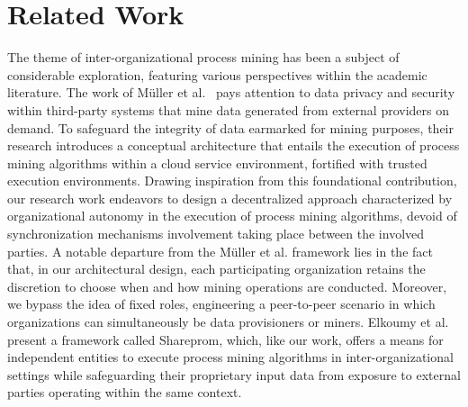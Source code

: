 \section{Related Work}
\label{sec:background}
The theme of inter-organizational process mining has been a subject of considerable exploration, featuring various perspectives within the academic literature. The work of M{\"u}ller et al.~\cite{muller2021process} pays attention to data privacy and security within third-party systems that mine data generated from external providers on demand. To safeguard the integrity of data earmarked for mining purposes, their research introduces a conceptual architecture that entails the execution of process mining algorithms within a cloud service environment, fortified with trusted execution environments. %
Drawing inspiration from this foundational contribution, our research work endeavors to design a decentralized approach characterized by organizational autonomy in the execution of process mining algorithms, devoid of synchronization mechanisms involvement taking place between the involved parties. A notable departure from the M{\"u}ller et al. framework lies in the fact that, in our architectural design, each participating organization retains the discretion to choose when and how mining operations are conducted. Moreover, we bypass the idea of fixed roles, engineering a peer-to-peer scenario in which organizations can simultaneously be data provisioners or miners.
Elkoumy et al.~\cite{elkoumy2020shareprom,elkoumy2020secure} present a framework called Shareprom, which, like our work, offers a means for independent entities to execute process mining algorithms in inter-organizational settings while safeguarding their proprietary input data from exposure to external parties operating within the same context.
